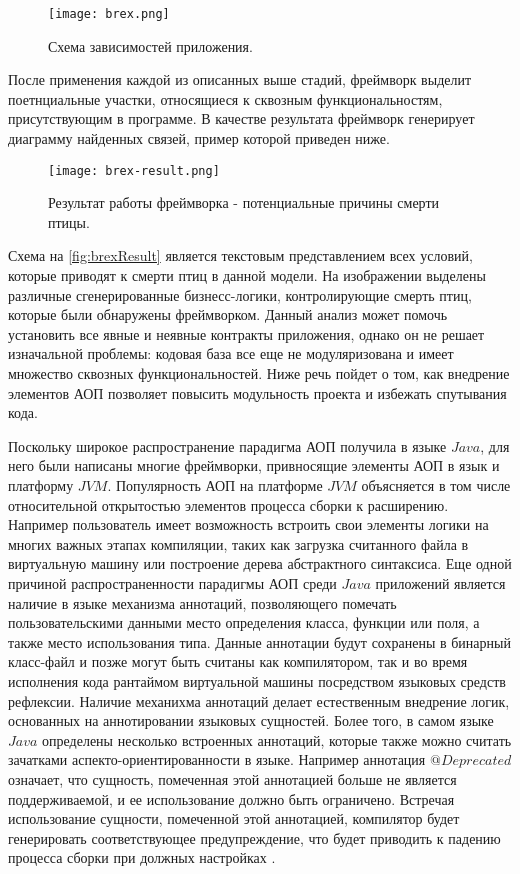 \begin{figure}[h]
\centering
\texttt{[image: brex.png]}
\caption{Схема зависимостей приложения.}
\label{fig:brexSchema}
\end{figure}

После применения каждой из описанных выше стадий, фреймворк выделит поетнциальные участки, относящиеся к сквозным функциональностям, присутствующим в программе. В качестве результата фреймворк генерирует диаграмму найденных связей, пример которой приведен ниже.

\begin{figure}[h]
\centering
\texttt{[image: brex-result.png]}
\caption{Результат работы фреймворка - потенциальные причины смерти птицы.}
\label{fig:brexResult}
\end{figure}

Схема на \autoref{fig:brexResult} является текстовым представлением всех условий, которые приводят к смерти птиц в данной модели. На изображении выделены различные сгенерированные бизнесс-логики, контролирующие смерть птиц, которые были обнаружены фреймворком. Данный анализ может помочь установить все явные и неявные контракты приложения, однако он не решает изначальной проблемы: кодовая база все еще не модуляризована и имеет множество сквозных функциональностей. Ниже речь пойдет о том, как внедрение элементов АОП позволяет повысить модульность проекта и избежать спутывания кода.

Поскольку широкое распространение парадигма АОП получила в языке $Java$, для него были написаны многие фреймворки, привносящие элементы АОП в язык и платформу $JVM$. Популярность АОП на платформе $JVM$ объясняется в том числе относительной открытостью элементов процесса сборки к расширению. Например пользователь имеет возможность встроить свои элементы логики на многих важных этапах компиляции, таких как загрузка считанного файла в виртуальную машину или построение дерева абстрактного синтаксиса. Еще одной причиной распространенности парадигмы АОП среди $Java$ приложений является наличие в языке механизма аннотаций, позволяющего помечать пользовательскими данными место определения класса, функции или поля, а также место использования типа. Данные аннотации будут сохранены в бинарный класс-файл и позже могут быть считаны как компилятором, так и во время исполнения кода рантаймом виртуальной машины посредством языковых средств рефлексии. Наличие механихма аннотаций делает естественным внедрение логик, основанных на аннотировании языковых сущностей. Более того, в самом языке $Java$ определены несколько встроенных аннотаций, которые также можно считать зачатками аспекто-ориентированности в языке. Например аннотация $@Deprecated$ означает, что сущность, помеченная этой аннотацией больше не является поддерживаемой, и ее использование должно быть ограничено. Встречая использование сущности, помеченной этой аннотацией, компилятор будет генерировать соответствующее предупреждение, что будет приводить к падению процесса сборки при должных настройках \cite{javaAnnotations}.

